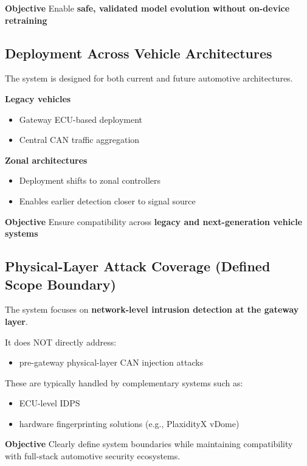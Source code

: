 \documentclass{article}
\begin{document}
\textbf{Objective}
Enable \textbf{safe, validated model evolution without on-device retraining}

\subsection{Deployment Across Vehicle Architectures}
The system is designed for both current and future automotive architectures.

\textbf{Legacy vehicles}
\begin{itemize}[noitemsep]
    \item Gateway ECU-based deployment
    \item Central CAN traffic aggregation
\end{itemize}

\textbf{Zonal architectures}
\begin{itemize}[noitemsep]
    \item Deployment shifts to zonal controllers
    \item Enables earlier detection closer to signal source
\end{itemize}

\textbf{Objective}
Ensure compatibility across \textbf{legacy and next-generation vehicle systems}

\subsection{Physical-Layer Attack Coverage (Defined Scope Boundary)}
The system focuses on \textbf{network-level intrusion detection at the gateway layer}.

It does NOT directly address:
\begin{itemize}[noitemsep]
    \item pre-gateway physical-layer CAN injection attacks
\end{itemize}
These are typically handled by complementary systems such as:
\begin{itemize}[noitemsep]
    \item ECU-level IDPS
    \item hardware fingerprinting solutions (e.g., PlaxidityX vDome)
\end{itemize}

\textbf{Objective}
Clearly define system boundaries while maintaining compatibility with full-stack automotive security ecosystems.
\end{document}
